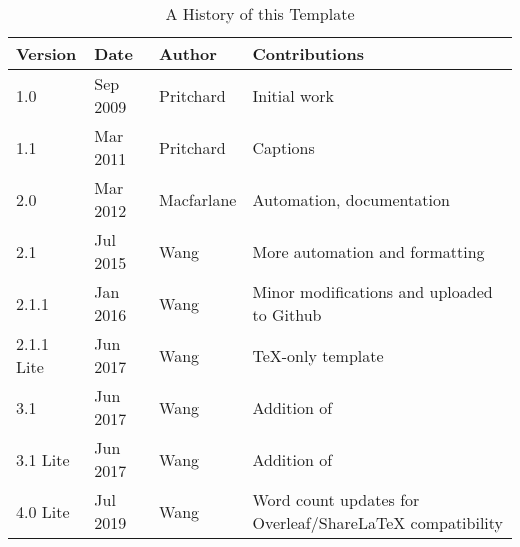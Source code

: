 \begin{table}[!ht]
  \caption{A History of this Template}\label{tab:versions}
  \begin{center}
    \begin{tabular}{l l l l}
      Version    & Date     & Author     & Contributions                                            \\\hline
      1.0        & Sep 2009 & Pritchard  & Initial work                                             \\
      1.1        & Mar 2011 & Pritchard  & Captions                                                 \\
      2.0        & Mar 2012 & Macfarlane & Automation, documentation                                \\
      2.1        & Jul 2015 & Wang       & More automation and formatting                           \\
      2.1.1      & Jan 2016 & Wang       & Minor modifications and uploaded to Github               \\
      2.1.1 Lite & Jun 2017 & Wang       & \TeX-only template                                       \\
      3.1        & Jun 2017 & Wang       & Addition of \verb1trbunofficial.cls1                     \\
      3.1 Lite   & Jun 2017 & Wang       & Addition of \verb1trbunofficial.cls1                     \\
      4.0 Lite   & Jul 2019 & Wang       & Word count updates for Overleaf/ShareLaTeX compatibility \\\hline
    \end{tabular}
  \end{center}
\end{table}